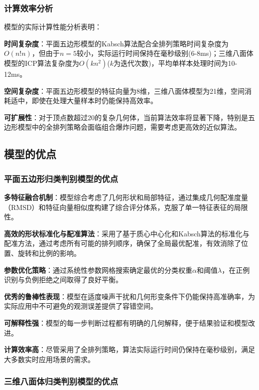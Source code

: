 \subsubsection{计算效率分析}

模型的实际计算性能分析表明：


     \textbf{时间复杂度}：平面五边形模型的Kabsch算法配合全排列策略时间复杂度为$O(n!n)$，但由于$n=5$较小，实际运行时间保持在毫秒级别(6-8ms)；三维八面体模型的ICP算法复杂度为$O(kn^2)$($k$为迭代次数)，平均单样本处理时间为10-12ms。
    
     \textbf{空间复杂度}：平面五边形模型的特征向量为8维，三维八面体模型为21维，空间消耗适中，即使在处理大量样本时仍能保持高效率。
    
     \textbf{可扩展性}：对于顶点数超过20的复杂几何体，当前算法效率将显著下降，特别是五边形模型中的全排列策略会面临组合爆炸问题，需要考虑更高效的近似算法。


\subsection{模型的优点}

\subsubsection{平面五边形归类判别模型的优点}


     \textbf{多特征融合机制}：模型综合考虑了几何形状和局部特征，通过集成几何配准度量（RMSD）和特征向量相似度构建了综合评分体系，克服了单一特征表征的局限性。
    
     \textbf{高效的形状标准化与配准算法}：采用了基于质心中心化和Kabsch算法的标准化与配准方法，通过考虑所有可能的排列顺序，确保了全局最优配准，有效消除了位置、旋转和比例的影响。
    
     \textbf{参数优化策略}：通过系统性参数网格搜索确定最优的分类权重$\alpha$和阈值$\lambda$，在正例识别与负例拒绝之间取得了良好平衡。
    
     \textbf{优秀的鲁棒性表现}：模型在适度噪声干扰和几何形变条件下仍能保持高准确率，为实际应用中不可避免的观测误差提供了容错空间。
    
     \textbf{可解释性强}：模型的每一步判断过程都有明确的几何解释，便于结果验证和模型改进。
    
     \textbf{计算效率高}：尽管采用了全排列策略，算法实际运行时间仍保持在毫秒级别，满足大多数实时应用场景的需求。


\subsubsection{三维八面体归类判别模型的优点}


